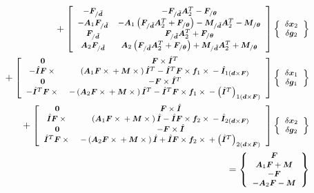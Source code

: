 \documentclass[10pt,fleqn,subeqn]{report}
\newcommand{\T}[1]{\bm{#1}}
\newcommand{\TT}[1]{\bm{#1}}
\begin{document}
\begin{align}
	\footnotesize
	\mbox{} + \sqbr{\matr{cc}{
		- \T{F}_{/\tilde{\T{d}}}
		& - \T{F}_{/\tilde{\T{d}}} \TT{A}_2^T
			- \T{F}_{/\T{\theta}}
		\\
%
		- \TT{A}_1 \T{F}_{/\tilde{\T{d}}}
		& - \TT{A}_1 \plbr{
			\T{F}_{/\tilde{\T{d}}} \TT{A}_2^T
			+ \T{F}_{/\T{\theta}}
		}
		- \T{M}_{/\tilde{\T{d}}} \TT{A}_2^T
			- \T{M}_{/\T{\theta}}
		\\
%
		\T{F}_{/\tilde{\T{d}}}
		& \T{F}_{/\tilde{\T{d}}} \TT{A}_2^T
			+ \T{F}_{/\T{\theta}}
		\\
%
		\TT{A}_2 \T{F}_{/\tilde{\T{d}}}
		& \TT{A}_2 \plbr{
			\T{F}_{/\tilde{\T{d}}} \TT{A}_2^T
			+ \T{F}_{/\T{\theta}}
		}
		+ \T{M}_{/\tilde{\T{d}}} \TT{A}_2^T
			+ \T{M}_{/\T{\theta}}
	}} \cubr{\cvvect{
		\delta\T{x}_2 \\
		\delta\T{g}_2
	}} & \nonumber \\
	\footnotesize
	\mbox{} + \sqbr{\matr{cc}{
		\T{0} & \T{F}\times\hat{\T{I}}^T
		\\
%
		- \hat{\TT{I}}\T{F}\times{}
		& \plbr{
			\TT{A}_1 \T{F}\times{}
			+ \T{M}\times{}
		} \hat{\TT{I}}^T
			- \hat{\TT{I}}^T \T{F}\times\T{f}_1\times{}
			- \hat{\TT{I}}_{1\plbr{\T{d}\times\T{F}}}
		\\
%
		\T{0} & - \T{F}\times\hat{\T{I}}^T
		\\
%
		- \hat{\TT{I}}^T\T{F}\times{}
		&  - \plbr{
			\TT{A}_2 \T{F}\times{}
			+ \T{M}\times{}
		} \hat{\TT{I}}^T
			- \hat{\TT{I}}^T \T{F}\times\T{f}_1\times{}
			- \plbr{\hat{\TT{I}}^T}_{1\plbr{\T{d}\times\T{F}}}
	}} \cubr{\cvvect{
		\delta\T{x}_1 \\
		\delta\T{g}_1
	}} & \nonumber \\
	\footnotesize
	\mbox{} + \sqbr{\matr{cc}{
		\T{0} & \T{F}\times\hat{\T{I}}
		\\
%
		\hat{\TT{I}}\T{F}\times{}
		& \plbr{
			\TT{A}_1 \T{F}\times{}
			+ \T{M}\times{}
		} \hat{\TT{I}}
			- \hat{\TT{I}} \T{F}\times\T{f}_2\times{}
			- \hat{\TT{I}}_{2\plbr{\T{d}\times\T{F}}}
		\\
%
		\T{0} & - \T{F}\times\hat{\T{I}}
		\\
%
		\hat{\TT{I}}^T\T{F}\times{}
		& - \plbr{
			\TT{A}_2 \T{F}\times{}
			+ \T{M}\times{}
		} \hat{\TT{I}}
			+ \hat{\TT{I}} \T{F}\times\T{f}_2\times{}
			+ \plbr{\hat{\TT{I}}^T}_{2\plbr{\T{d}\times\T{F}}}
	}} \cubr{\cvvect{
		\delta\T{x}_2 \\
		\delta\T{g}_2
	}}
	& \nonumber \\
	\footnotesize \mbox{}
	= \cubr{\cvvect{
		\T{F} \\
		\TT{A}_1 \T{F} + \T{M} \\
		- \T{F} \\
		- \TT{A}_2 \T{F} - \T{M}
	}} &
\end{align}
\end{document}

